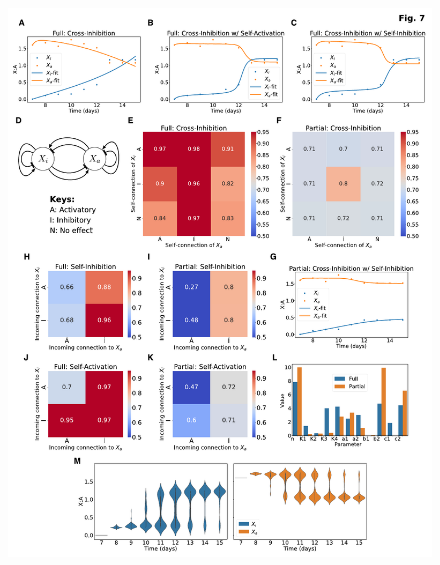 \documentclass[11pt,a4paper]{article}
\begin{document}
\begin{figure}[p]
\begin{subfigure}[c]{0.32\textwidth}
        \label{IIII-part}
    \end{subfigure}
    \begin{subfigure}[c]{0.28\textwidth}
        \label{rsq-cross-i-full}
    \end{subfigure}
    \begin{subfigure}[c]{0.28\textwidth}
        \label{rsq-cross-i-part}
    \end{subfigure}
    \begin{subfigure}[c]{0.32\textwidth}
        \label{IIII-parm}
    \end{subfigure}
    \begin{subfigure}[c]{0.28\textwidth}
        \label{rsq-cross-a-full}
    \end{subfigure}
    \begin{subfigure}[c]{0.28\textwidth}
        \label{rsq-cross-a-part}
    \end{subfigure}
    \begin{subfigure}[c]{0.28\textwidth}
        \label{IIII-noise}
    \end{subfigure}
    \includegraphics[width=\textwidth]{XCR-model.pdf}

\end{figure}
\end{document}
